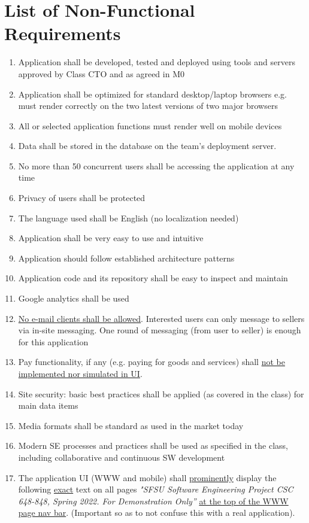 \section{List of Non-Functional Requirements}
\begin{enumerate}
	\item Application shall be developed, tested and deployed using tools and servers approved by
Class CTO and as agreed in M0
	\item Application shall be optimized for standard desktop/laptop browsers e.g. must render
correctly on the two latest versions of two major browsers
	\item All or selected application functions must render well on mobile devices
	\item Data shall be stored in the database on the team’s deployment server.
	\item No more than 50 concurrent users shall be accessing the application at any time
	\item Privacy of users shall be protected
	\item The language used shall be English (no localization needed)
	\item Application shall be very easy to use and intuitive
	\item Application should follow established architecture patterns
	\item Application code and its repository shall be easy to inspect and maintain
	\item Google analytics shall be used
	\item \underline{No e-mail clients shall be allowed}. Interested users can only message to sellers via in-site
messaging. One round of messaging (from user to seller) is enough for this application
	\item Pay functionality, if any (e.g. paying for goods and services) shall \underline{not be implemented nor
simulated in UI}.
	\item Site security: basic best practices shall be applied (as covered in the class) for main data
items
	\item Media formats shall be standard as used in the market today
	\item Modern SE processes and practices shall be used as specified in the class, including
collaborative and continuous SW development
	\item The application UI (WWW and mobile) shall \underline{prominently} display the following \underline{exact} text on
all pages \textit{"SFSU Software Engineering Project CSC 648-848, Spring 2022. For
Demonstration Only”} \underline{at the top of the WWW page nav bar}. (Important so as to not confuse
this with a real application).
\end{enumerate}